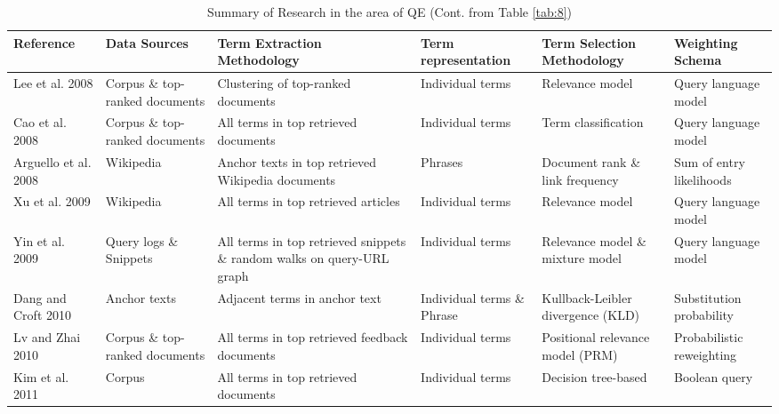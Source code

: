 \begin{landscape}
	\begin{table}
		\centering
		
		\caption{Summary of Research in the area of QE (Cont. from Table \ref{tab:8}) \label{tab:9}}{
			
			\begin{tabular}{ | M{3cm} | M{3cm} | M{3.2cm} | M{3cm} | M{3cm} | M{3cm} |}
				\hline 
				
				\textbf{Reference} & \textbf{Data Sources} & \textbf{Term Extraction Methodology} & \textbf{Term representation} & \textbf{Term Selection Methodology} & \textbf{Weighting Schema} \\ \hline 
				Lee et al. 2008 \cite{lee2008cluster} & Corpus \& top-ranked documents & Clustering of top-ranked documents & Individual terms & Relevance model &  Query language model  \\ \hline
				Cao et al. 2008 \cite{cao2008selecting} & Corpus \& top-ranked documents & All terms in top retrieved documents & Individual terms & Term classification & Query language model  \\ \hline
				Arguello et al. 2008 \cite{arguello2008document} & Wikipedia & Anchor texts in top retrieved Wikipedia documents  & Phrases & Document rank \& link frequency & Sum of entry likelihoods \\ \hline
				Xu et al. 2009 \cite{xu2009query} & Wikipedia & All terms in top retrieved articles  &  Individual terms & Relevance model & Query language model\\ \hline
				Yin et al. 2009 \cite{yin2009query} & Query logs \& Snippets  & All terms in top retrieved snippets \& random walks on query-URL graph & Individual terms & Relevance model \& mixture model  & Query language model \\ \hline
				Dang and Croft 2010 \cite{dang2010query} & Anchor texts & Adjacent terms in anchor text  & Individual terms \& Phrase & Kullback-Leibler divergence (KLD) & Substitution probability \\ \hline
				Lv and Zhai	2010 \cite{lv2010positional} & Corpus \& top-ranked documents & All terms in top retrieved feedback documents  & Individual terms & Positional relevance model (PRM) & Probabilistic reweighting \\ \hline
				Kim et al. 2011 \cite{kim2011automatic} & Corpus  & All terms in top retrieved documents  & Individual terms & Decision tree-based & Boolean query \\ \hline

\end{tabular}}
\end{table}
\end{landscape}
